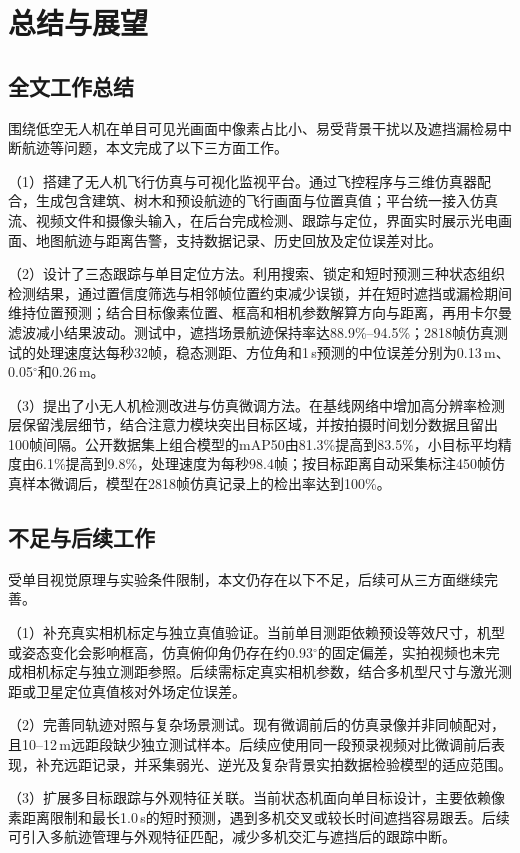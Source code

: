 \chapter{总结与展望}
\label{chap:conclusion}

\section{全文工作总结}

围绕低空无人机在单目可见光画面中像素占比小、易受背景干扰以及遮挡漏检易中断航迹等问题，本文完成了以下三方面工作。

（1）搭建了无人机飞行仿真与可视化监视平台。通过飞控程序与三维仿真器配合，生成包含建筑、树木和预设航迹的飞行画面与位置真值；平台统一接入仿真流、视频文件和摄像头输入，在后台完成检测、跟踪与定位，界面实时展示光电画面、地图航迹与距离告警，支持数据记录、历史回放及定位误差对比。

（2）设计了三态跟踪与单目定位方法。利用搜索、锁定和短时预测三种状态组织检测结果，通过置信度筛选与相邻帧位置约束减少误锁，并在短时遮挡或漏检期间维持位置预测；结合目标像素位置、框高和相机参数解算方向与距离，再用卡尔曼滤波减小结果波动。测试中，遮挡场景航迹保持率达88.9\%--94.5\%；2818帧仿真测试的处理速度达每秒32帧，稳态测距、方位角和1\,s预测的中位误差分别为0.13\,m、0.05$^{\circ}$和0.26\,m。

（3）提出了小无人机检测改进与仿真微调方法。在基线网络中增加高分辨率检测层保留浅层细节，结合注意力模块突出目标区域，并按拍摄时间划分数据且留出100帧间隔。公开数据集上组合模型的mAP50由81.3\%提高到83.5\%，小目标平均精度由6.1\%提高到9.8\%，处理速度为每秒98.4帧；按目标距离自动采集标注450帧仿真样本微调后，模型在2818帧仿真记录上的检出率达到100\%。

\section{不足与后续工作}

受单目视觉原理与实验条件限制，本文仍存在以下不足，后续可从三方面继续完善。

（1）补充真实相机标定与独立真值验证。当前单目测距依赖预设等效尺寸，机型或姿态变化会影响框高，仿真俯仰角仍存在约0.93$^{\circ}$的固定偏差，实拍视频也未完成相机标定与独立测距参照。后续需标定真实相机参数，结合多机型尺寸与激光测距或卫星定位真值核对外场定位误差。

（2）完善同轨迹对照与复杂场景测试。现有微调前后的仿真录像并非同帧配对，且10--12\,m远距段缺少独立测试样本。后续应使用同一段预录视频对比微调前后表现，补充远距记录，并采集弱光、逆光及复杂背景实拍数据检验模型的适应范围。

（3）扩展多目标跟踪与外观特征关联。当前状态机面向单目标设计，主要依赖像素距离限制和最长1.0\,s的短时预测，遇到多机交叉或较长时间遮挡容易跟丢。后续可引入多航迹管理与外观特征匹配，减少多机交汇与遮挡后的跟踪中断。
